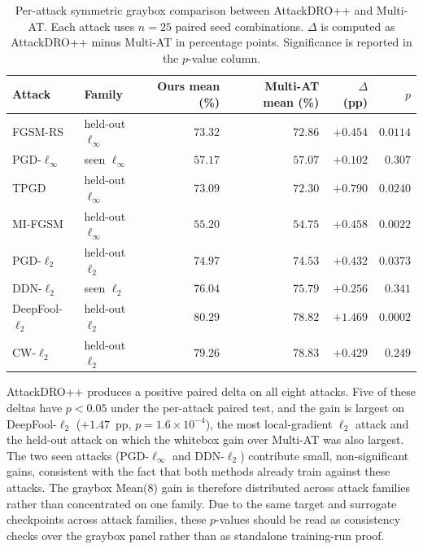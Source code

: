 \begin{table}[H]
\centering
\caption[Per-attack graybox comparison]{Per-attack symmetric graybox comparison between AttackDRO++
and Multi-AT. Each attack uses \(n=25\) paired seed combinations.
\(\Delta\) is computed as AttackDRO++ minus Multi-AT in percentage points.
Significance is reported in the \(p\)-value column.}
\label{tab:ch6_graybox_per_attack}
\small
\setlength{\tabcolsep}{4pt}
\renewcommand{\arraystretch}{1.10}
\begin{tabular}{llrrrr}
\toprule
Attack          & Family              & Ours mean (\%) & Multi-AT mean (\%) & $\Delta$ (pp) & $p$ \\
\midrule
FGSM-RS         & held-out $\ell_\infty$ & $73.32$ & $72.86$ & $+0.454$ & $0.0114$ \\
PGD-$\ell_\infty$ & seen $\ell_\infty$    & $57.17$ & $57.07$ & $+0.102$ & $0.307$  \\
TPGD            & held-out $\ell_\infty$ & $73.09$ & $72.30$ & $+0.790$ & $0.0240$ \\
MI-FGSM         & held-out $\ell_\infty$ & $55.20$ & $54.75$ & $+0.458$ & $0.0022$ \\
\midrule
PGD-$\ell_2$    & held-out $\ell_2$      & $74.97$ & $74.53$ & $+0.432$ & $0.0373$ \\
DDN-$\ell_2$    & seen $\ell_2$          & $76.04$ & $75.79$ & $+0.256$ & $0.341$  \\
DeepFool-$\ell_2$ & held-out $\ell_2$    & $80.29$ & $78.82$ & $+1.469$ & $0.0002$ \\
CW-$\ell_2$     & held-out $\ell_2$      & $79.26$ & $78.83$ & $+0.429$ & $0.249$  \\
\bottomrule
\end{tabular}
\end{table}

AttackDRO++ produces a positive paired delta on all eight attacks. Five
of these deltas have \(p < 0.05\) under the per-attack paired test, and the gain
is largest on DeepFool-$\ell_2$ ($+1.47$~pp, $p = 1.6\times 10^{-4}$),
the most local-gradient $\ell_2$ attack and the held-out attack on which
the whitebox gain over Multi-AT was also largest. The two seen
attacks (PGD-$\ell_\infty$ and DDN-$\ell_2$) contribute small,
non-significant gains, consistent with the fact that both methods
already train against these attacks. The graybox Mean(8) gain is
therefore distributed across attack families rather than concentrated on
one family. Due to the same target and
surrogate checkpoints across attack families, these \(p\)-values should be read
as consistency checks over the graybox panel rather than as standalone
training-run proof.

